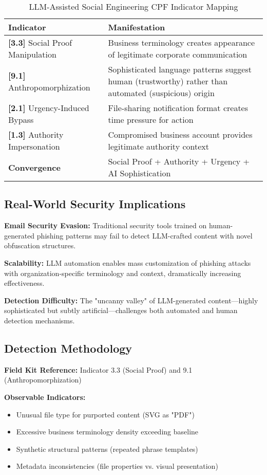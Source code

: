 \documentclass[11pt,a4paper]{article}
\begin{document}
\begin{table}[H]
\centering
\caption{LLM-Assisted Social Engineering CPF Indicator Mapping}
\begin{tabular}{lp{10cm}}
\toprule
\textbf{Indicator} & \textbf{Manifestation} \\
\midrule
\textbf{[3.3]} Social Proof Manipulation & Business terminology creates appearance of legitimate corporate communication \\
\textbf{[9.1]} Anthropomorphization & Sophisticated language patterns suggest human (trustworthy) rather than automated (suspicious) origin \\
\textbf{[2.1]} Urgency-Induced Bypass & File-sharing notification format creates time pressure for action \\
\textbf{[1.3]} Authority Impersonation & Compromised business account provides legitimate authority context \\
\midrule
\textbf{Convergence} & Social Proof + Authority + Urgency + AI Sophistication \\
\bottomrule
\end{tabular}
\end{table}

\subsection{Real-World Security Implications}

\textbf{Email Security Evasion:} Traditional security tools trained on human-generated phishing patterns may fail to detect LLM-crafted content with novel obfuscation structures.

\textbf{Scalability:} LLM automation enables mass customization of phishing attacks with organization-specific terminology and context, dramatically increasing effectiveness.

\textbf{Detection Difficulty:} The "uncanny valley" of LLM-generated content—highly sophisticated but subtly artificial—challenges both automated and human detection mechanisms.

\subsection{Detection Methodology}

\textbf{Field Kit Reference:} Indicator 3.3 (Social Proof) and 9.1 (Anthropomorphization)

\textbf{Observable Indicators:}
\begin{itemize}
\item Unusual file type for purported content (SVG as "PDF")
\item Excessive business terminology density exceeding baseline
\item Synthetic structural patterns (repeated phrase templates)
\item Metadata inconsistencies (file properties vs. visual presentation)
\end{itemize}
\end{document}
